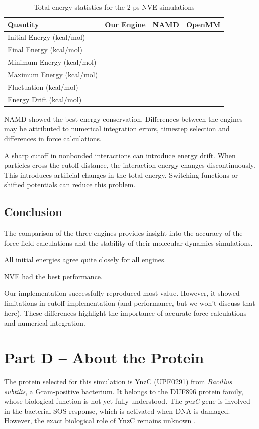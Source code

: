 \documentclass[11pt, a4paper]{article}
\begin{document}
\begin{table}[H]
    \centering
    \caption{Total energy statistics for the 2 ps NVE simulations}
    \begin{tabular}{lrrr}
        \hline
        \textbf{Quantity} &
        \textbf{Our Engine} &
        \textbf{NAMD} &
        \textbf{OpenMM} \\
        \hline
        Initial Energy (kcal/mol) &  &  & \\
        Final Energy (kcal/mol)   &  &  & \\
        Minimum Energy (kcal/mol) &  &  & \\
        Maximum Energy (kcal/mol) &  &  & \\
        Fluctuation (kcal/mol)    &  &  & \\
        Energy Drift (kcal/mol)   &  &  & \\
        \hline
    \end{tabular}
    \label{tab:nve_energy}
\end{table}

NAMD showed the best energy conservation. Differences between the engines may be attributed
to numerical integration errors, timestep selection and differences
in force calculations.

A sharp cutoff in nonbonded interactions can introduce energy drift.
When particles cross the cutoff distance, the interaction energy
changes discontinuously. This introduces artificial changes in the
total energy. Switching functions or shifted potentials can reduce
this problem.

\subsection{Conclusion}

The comparison of the three engines provides insight into the
accuracy of the force-field calculations and the stability of their
molecular dynamics simulations.

All initial energies agree quite closely for all engines. 

NVE had the best performance. 

Our implementation successfully reproduced most value. However, it showed limitations in
cutoff implementation (and performance, but we won't discuss that here). These differences
highlight the importance of accurate force calculations and
numerical integration.

\section{Part D -- About the Protein}
The protein selected for this simulation is YnzC (UPF0291) from \textit{Bacillus subtilis}, a Gram-positive bacterium. It belongs to the DUF896 protein family, whose biological function is not yet fully understood. The \textit{ynzC} gene is involved in the bacterial SOS response, which is activated when DNA is damaged. However, the exact biological role of YnzC remains unknown \cite{rcsb_2hep,uniprot_ynzc}.
\end{document}
